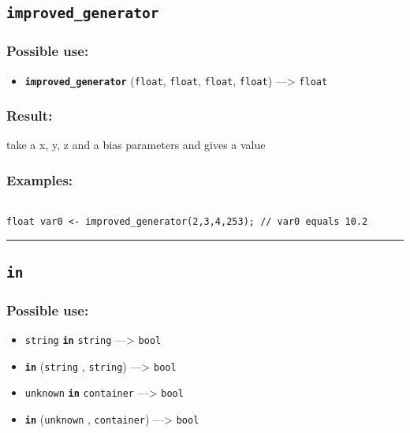 \documentclass[]{book}
\providecommand{\tightlist}{%
  \setlength{\itemsep}{0pt}\setlength{\parskip}{0pt}}
\theoremstyle{definition}
\theoremstyle{definition}
\theoremstyle{definition}
\theoremstyle{remark}
\begin{document}
\subsection{\texorpdfstring{\texttt{improved\_generator}}{improved\_generator}}\label{improved_generator}

\subsubsection{Possible use:}\label{possible-use-265}

\begin{itemize}
\tightlist
\item
  \textbf{\texttt{improved\_generator}} (\texttt{float}, \texttt{float},
  \texttt{float}, \texttt{float}) ---\textgreater{} \texttt{float}
\end{itemize}

\subsubsection{Result:}\label{result-255}

take a x, y, z and a bias parameters and gives a value

\subsubsection{Examples:}\label{examples-203}

\begin{verbatim}
 
float var0 <- improved_generator(2,3,4,253); // var0 equals 10.2
\end{verbatim}

\begin{center}\rule{0.5\linewidth}{\linethickness}\end{center}

\subsection{\texorpdfstring{\texttt{in}}{in}}\label{in}

\subsubsection{Possible use:}\label{possible-use-266}

\begin{itemize}
\tightlist
\item
  \texttt{string} \textbf{\texttt{in}} \texttt{string} ---\textgreater{}
  \texttt{bool}
\item
  \textbf{\texttt{in}} (\texttt{string} , \texttt{string})
  ---\textgreater{} \texttt{bool}
\item
  \texttt{unknown} \textbf{\texttt{in}} \texttt{container}
  ---\textgreater{} \texttt{bool}
\item
  \textbf{\texttt{in}} (\texttt{unknown} , \texttt{container})
  ---\textgreater{} \texttt{bool}
\end{itemize}
\end{document}
